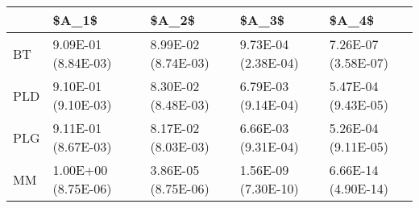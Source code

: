 \begin{tabular}{lllll}
\toprule
{} &                \$A\_1\$ &                \$A\_2\$ &                \$A\_3\$ &                \$A\_4\$ \\
\midrule
BT  &  9.09E-01 (8.84E-03) &  8.99E-02 (8.74E-03) &  9.73E-04 (2.38E-04) &  7.26E-07 (3.58E-07) \\
PLD &  9.10E-01 (9.10E-03) &  8.30E-02 (8.48E-03) &  6.79E-03 (9.14E-04) &  5.47E-04 (9.43E-05) \\
PLG &  9.11E-01 (8.67E-03) &  8.17E-02 (8.03E-03) &  6.66E-03 (9.31E-04) &  5.26E-04 (9.11E-05) \\
MM  &  1.00E+00 (8.75E-06) &  3.86E-05 (8.75E-06) &  1.56E-09 (7.30E-10) &  6.66E-14 (4.90E-14) \\
\bottomrule
\end{tabular}
